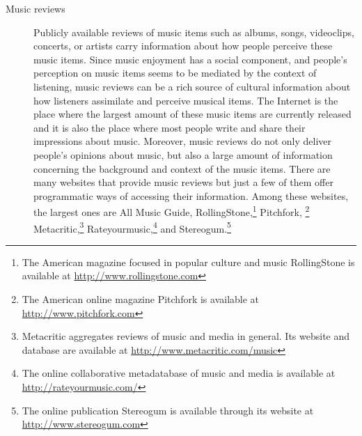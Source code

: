 \begin{description}
\item [Music reviews] Publicly available reviews of music items such as albums, songs, videoclips, concerts, or artists carry information about how people perceive these music items. Since music enjoyment has a social component, and people's perception on music items seems to be mediated by the context of listening, music reviews can be a rich source of cultural information about how listeners assimilate and perceive musical items. 
The Internet is the place where the largest amount of these music items are currently released and it is also the place where most people write  and share their impressions about music. 
Moreover, music reviews do not only deliver people's opinions about music, but also a large amount of information concerning the background and context of the music items.
There are many websites that provide music reviews but just a few of them offer programmatic ways of accessing their information. Among these websites, the largest ones are
All Music Guide,
RollingStone,\footnote{The American magazine focused in popular culture and music RollingStone is available at \url{http://www.rollingstone.com}} Pitchfork,
\footnote{The American online magazine Pitchfork is available at \url{http://www.pitchfork.com}} 
Metacritic,\footnote{Metacritic aggregates reviews of music and media in general. Its website and database are available at \url{http://www.metacritic.com/music}} 
Rateyourmusic,\footnote{The online collaborative metadatabase of music and media is available at \url{http://rateyourmusic.com/}} and 
Stereogum.\footnote{The online publication Stereogum is available through its website at \url{http://www.stereogum.com}}



\end{description}
